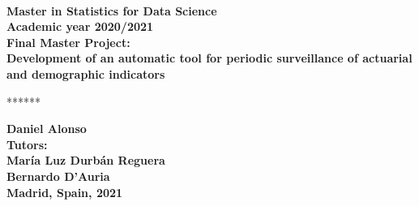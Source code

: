 \documentclass[15pt]{article}
\begin{document}
	\begin{titlepage}
	\begin{center}
	\begin{figure}[H]
		\centering
	\end{figure}
	\textbf{} \\[2 cm]
	\textbf{\large Master in Statistics for Data Science}\\[0.1 cm]
	\textbf{\large Academic year 2020/2021}\\[1.5 cm]
	\textbf{\large Final Master Project:}\\[0.1 cm]
	\linespread{2}\selectfont\bfseries{\LARGE Development of an automatic tool for periodic surveillance of actuarial and demographic indicators}
	\\[3 cm]
	\centerline{******}
	\textbf{\LARGE Daniel Alonso}\\[0.6cm]
	\textbf{Tutors:}\\[0.01cm]
	\textbf{\large María Luz Durbán Reguera \\ Bernardo D'Auria}\\[1 cm]
	\textbf{\large Madrid, Spain, 2021}

	\end{center}
	\end{titlepage}
\end{document}
